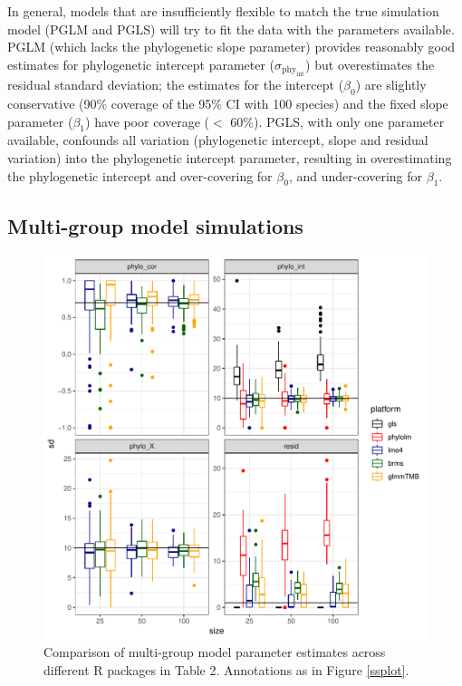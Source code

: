 \documentclass[12pt]{article}
\begin{document}
In general, models that are insufficiently flexible to match the true simulation model (PGLM and PGLS) will try to fit the data with the parameters available. 
PGLM (which lacks the phylogenetic slope parameter) provides reasonably good estimates for phylogenetic intercept parameter ($\sigma_{\mathrm{phy_{int}}}$) but overestimates the residual standard deviation; the estimates for the intercept ($\beta_0$) are slightly conservative (90\% coverage of the 95\% CI with 100 species) and the fixed slope parameter ($\beta_1$) have poor coverage ($<$ 60\%).
PGLS, with only one parameter available, confounds all variation (phylogenetic intercept, slope and residual variation) into the phylogenetic intercept parameter, resulting in overestimating the phylogenetic intercept and over-covering for $\beta_0$, and under-covering for $\beta_1$.

\subsection*{Multi-group model simulations}

\begin{center}
\begin{figure}[H]
  \includegraphics[scale=0.8,page=4]{./git_push/plot.Rout.pdf}
  \caption{Comparison of multi-group model parameter estimates across different R packages in Table 2. Annotations as in Figure \ref{ssplot}.}
  \label{msplot}
\end{figure}
\end{center}
\end{document}
